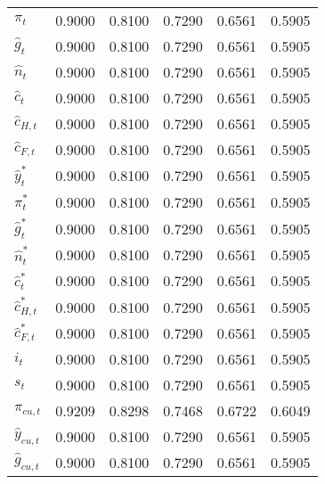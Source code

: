 \begin{center}
\begin{longtable}{lccccc}
${\pi_t}              $	 & 	    0.9000	 & 	    0.8100	 & 	    0.7290	 & 	    0.6561	 & 	    0.5905 \\ 
${\hat g_t}           $	 & 	    0.9000	 & 	    0.8100	 & 	    0.7290	 & 	    0.6561	 & 	    0.5905 \\ 
${\hat n_t}           $	 & 	    0.9000	 & 	    0.8100	 & 	    0.7290	 & 	    0.6561	 & 	    0.5905 \\ 
${\hat c_t}           $	 & 	    0.9000	 & 	    0.8100	 & 	    0.7290	 & 	    0.6561	 & 	    0.5905 \\ 
${\hat c_{H,t}}       $	 & 	    0.9000	 & 	    0.8100	 & 	    0.7290	 & 	    0.6561	 & 	    0.5905 \\ 
${\hat c_{F,t}}       $	 & 	    0.9000	 & 	    0.8100	 & 	    0.7290	 & 	    0.6561	 & 	    0.5905 \\ 
${\hat y_t^*}         $	 & 	    0.9000	 & 	    0.8100	 & 	    0.7290	 & 	    0.6561	 & 	    0.5905 \\ 
${\pi_t^*}            $	 & 	    0.9000	 & 	    0.8100	 & 	    0.7290	 & 	    0.6561	 & 	    0.5905 \\ 
${\hat g_t^*}         $	 & 	    0.9000	 & 	    0.8100	 & 	    0.7290	 & 	    0.6561	 & 	    0.5905 \\ 
${\hat n_t^*}         $	 & 	    0.9000	 & 	    0.8100	 & 	    0.7290	 & 	    0.6561	 & 	    0.5905 \\ 
${\hat c_t^*}         $	 & 	    0.9000	 & 	    0.8100	 & 	    0.7290	 & 	    0.6561	 & 	    0.5905 \\ 
${\hat c_{H,t}^*}     $	 & 	    0.9000	 & 	    0.8100	 & 	    0.7290	 & 	    0.6561	 & 	    0.5905 \\ 
${\hat c_{F,t}^*}     $	 & 	    0.9000	 & 	    0.8100	 & 	    0.7290	 & 	    0.6561	 & 	    0.5905 \\ 
${i_t}                $	 & 	    0.9000	 & 	    0.8100	 & 	    0.7290	 & 	    0.6561	 & 	    0.5905 \\ 
${s_t}                $	 & 	    0.9000	 & 	    0.8100	 & 	    0.7290	 & 	    0.6561	 & 	    0.5905 \\ 
${\pi_{cu,t}}         $	 & 	    0.9209	 & 	    0.8298	 & 	    0.7468	 & 	    0.6722	 & 	    0.6049 \\ 
${\hat y_{cu,t}}      $	 & 	    0.9000	 & 	    0.8100	 & 	    0.7290	 & 	    0.6561	 & 	    0.5905 \\ 
${\hat g_{cu,t}}      $	 & 	    0.9000	 & 	    0.8100	 & 	    0.7290	 & 	    0.6561	 & 	    0.5905 \\ 
\end{longtable}
 \end{center}
